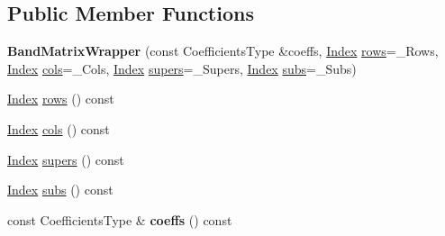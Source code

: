 \subsection*{Public Member Functions}
\begin{DoxyCompactItemize}
\item 
\mbox{\label{class_eigen_1_1internal_1_1_band_matrix_wrapper_a1da1c6d582ee0fd5effd8290d114af62}} 
{\bfseries Band\+Matrix\+Wrapper} (const Coefficients\+Type \&coeffs, \hyperlink{group___core___module_a554f30542cc2316add4b1ea0a492ff02}{Index} \hyperlink{class_eigen_1_1internal_1_1_band_matrix_wrapper_a8d23b9d25729ac15c06591c810d13160}{rows}=\+\_\+\+Rows, \hyperlink{group___core___module_a554f30542cc2316add4b1ea0a492ff02}{Index} \hyperlink{class_eigen_1_1internal_1_1_band_matrix_wrapper_a5c81a2138f0adfb23216de383aaeeeab}{cols}=\+\_\+\+Cols, \hyperlink{group___core___module_a554f30542cc2316add4b1ea0a492ff02}{Index} \hyperlink{class_eigen_1_1internal_1_1_band_matrix_wrapper_a5e874cc43bb0b406241e3cc6042335e5}{supers}=\+\_\+\+Supers, \hyperlink{group___core___module_a554f30542cc2316add4b1ea0a492ff02}{Index} \hyperlink{class_eigen_1_1internal_1_1_band_matrix_wrapper_a146d5ceb44c93c8e0a48c207ad252a8f}{subs}=\+\_\+\+Subs)
\item 
\hyperlink{group___core___module_a554f30542cc2316add4b1ea0a492ff02}{Index} \hyperlink{class_eigen_1_1internal_1_1_band_matrix_wrapper_a8d23b9d25729ac15c06591c810d13160}{rows} () const
\item 
\hyperlink{group___core___module_a554f30542cc2316add4b1ea0a492ff02}{Index} \hyperlink{class_eigen_1_1internal_1_1_band_matrix_wrapper_a5c81a2138f0adfb23216de383aaeeeab}{cols} () const
\item 
\hyperlink{group___core___module_a554f30542cc2316add4b1ea0a492ff02}{Index} \hyperlink{class_eigen_1_1internal_1_1_band_matrix_wrapper_a5e874cc43bb0b406241e3cc6042335e5}{supers} () const
\item 
\hyperlink{group___core___module_a554f30542cc2316add4b1ea0a492ff02}{Index} \hyperlink{class_eigen_1_1internal_1_1_band_matrix_wrapper_a146d5ceb44c93c8e0a48c207ad252a8f}{subs} () const
\item 
\mbox{\label{class_eigen_1_1internal_1_1_band_matrix_wrapper_a86c85e74d144b8db575f3814e3069651}} 
const Coefficients\+Type \& {\bfseries coeffs} () const
\item 

\end{DoxyCompactItemize}
